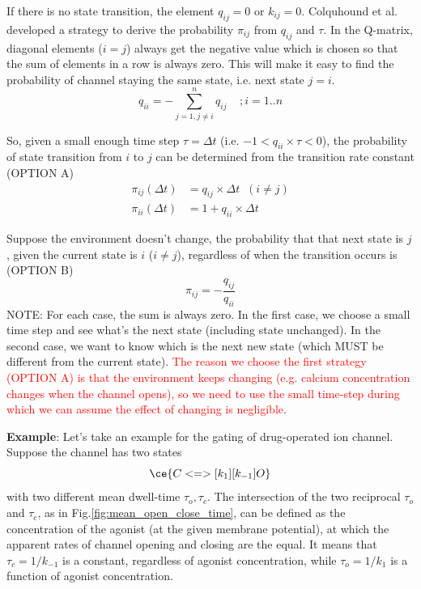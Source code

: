 If there is no state transition, the element $q_{ij}=0$ or $k_{ij}=0$.
Colquhound et al. developed a strategy to derive the probability $\pi_{ij}$ from
$q_{ij}$ and $\tau$. In the Q-matrix, diagonal elements ($i=j$) always get the
negative value which is chosen so that the sum of elements in a row is always
zero. This will make it easy to find the probability of channel staying the same
state, i.e. next state $j=i$.
\begin{equation}
q_{ii} = - \sum^{n}_{j=1,j\ne i} q_{ij} \;\;\;\;; i=1..n
\end{equation}

So, given a small enough time step $\tau=\Delta t$ (i.e. $-1 < q_{ii}\times \tau
< 0$), the probability of state transition from $i$ to $j$ can be determined
from the transition rate constant (OPTION A)
\begin{equation}
\begin{split}
\pi_{ij}(\Delta t) &= q_{ij} \times \Delta t \;\; (i\ne j)\\
\pi_{ii}(\Delta t) &= 1 + q_{ii}\times \Delta t
\end{split}
\end{equation}

Suppose the environment doesn't change, the probability that that next state is
$j$, given the current state is $i$ ($i\ne j$), regardless of when the
transition occurs is (OPTION B)
\begin{equation}
\pi_{ij} = -\frac{q_{ij}}{q_{ii}}
\end{equation}
NOTE: For each case, the sum is always zero. In the first case, we choose a
small time step and see what's the next state (including state unchanged). In
the second case, we want to know which is the next new state (which MUST be
different from the current state). \textcolor{red}{The reason we choose the
first strategy (OPTION A) is that the environment keeps changing (e.g. calcium
concentration changes when the channel opens), so we need to use  the small
time-step during which we can assume the effect of changing is  negligible}.

{\bf Example}:  Let's take an example for the gating of drug-operated ion
channel. Suppose the channel has two states
\begin{equation}
\ce{C <=>[k_1][k_{-1}] O}
\end{equation}
with two different mean dwell-time $\tau_o, \tau_c$. The intersection of the two
reciprocal $\tau_o$ and $\tau_c$, as in Fig.\ref{fig:mean_open_close_time}, can
be defined as the concentration of the agonist (at the given membrane
potential), at which the apparent rates of channel opening and closing are the
equal.  It means that $\tau_c=1/k_{-1}$ is a constant, regardless of agonist
concentration, while $\tau_o=1/k_{1}$ is a function of agonist concentration.

